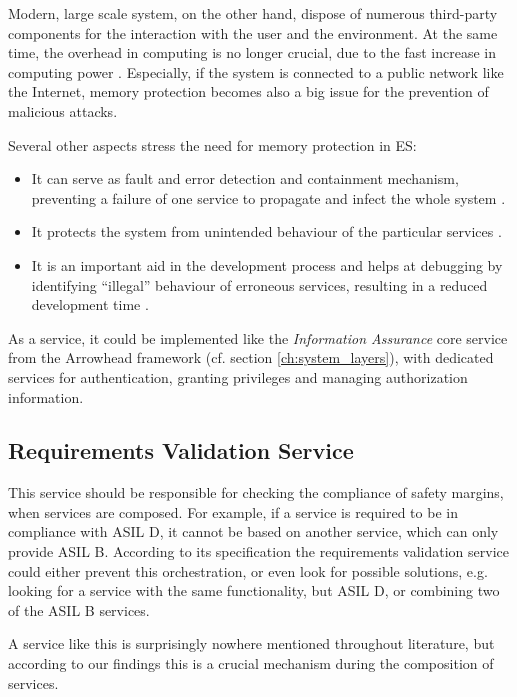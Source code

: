 Modern, large scale system, on the other hand, dispose of numerous third-party components for the interaction with the user and the environment. At the same time, the overhead in computing is no longer crucial, due to the fast increase in computing power  \cite{yamada2008}. Especially, if the system is connected to a public network like the Internet, memory protection becomes also a big issue for the prevention of malicious attacks.

Several other aspects stress the need for memory protection in ES:
\begin{itemize}
\item It can serve as fault and error detection and containment mechanism, preventing a failure of one service to propagate and infect the whole system \cite{yamada2008}.
\item It protects the system from unintended behaviour of the particular services \cite{yamada2014}.
\item It is an important aid in the development process and helps at debugging by identifying ``illegal'' behaviour of erroneous services, resulting in a reduced development time \cite{yamada2008} \cite{yamada2014}.
\end{itemize}

As a service, it could be implemented like the \emph{Information Assurance} core service from the Arrowhead framework (cf. section \ref{ch:system_layers}), with dedicated services for authentication, granting privileges and managing authorization information.


\subsection{Requirements Validation Service}

This service should be responsible for checking the compliance of safety margins, when services are composed. For example, if a service is required to be in compliance with ASIL D, it cannot be based on another service, which can only provide ASIL B. According to its specification the requirements validation service could either prevent this orchestration, or even look for possible solutions, e.g. looking for a service with the same functionality, but ASIL D, or combining two of the ASIL B services.

A service like this is surprisingly nowhere mentioned throughout literature, but according to our findings this is a crucial mechanism during the composition of services.









